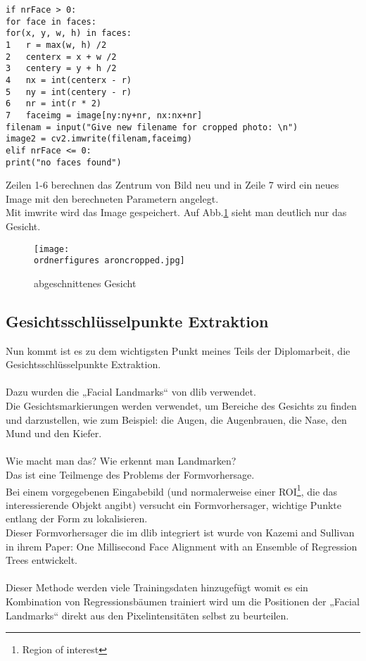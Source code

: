 \begin{lstlisting}
if nrFace > 0:
for face in faces:
for(x, y, w, h) in faces:
1	r = max(w, h) /2 
2	centerx = x + w /2 
3	centery = y + h /2
4	nx = int(centerx - r) 
5	ny = int(centery - r) 
6	nr = int(r * 2) 
7	faceimg = image[ny:ny+nr, nx:nx+nr] 
filenam = input("Give new filename for cropped photo: \n")
image2 = cv2.imwrite(filenam,faceimg)
elif nrFace <= 0:
print("no faces found")

\end{lstlisting}

Zeilen 1-6 berechnen das Zentrum von Bild neu und in Zeile 7 wird ein neues Image mit den berechneten Parametern angelegt.\\
Mit imwrite wird das Image gespeichert. Auf Abb.\ref{fig:aroncropped} sieht man deutlich nur das Gesicht. \\

\begin{figure}[H]
\texttt{[image: \\ordnerfigures aroncropped.jpg]}
\caption{abgeschnittenes Gesicht}
\label{fig:aroncropped}
\end{figure}

\subsection{Gesichtsschlüsselpunkte Extraktion}


Nun kommt ist es zu dem wichtigsten Punkt meines Teils der Diplomarbeit, die Gesichtsschlüsselpunkte Extraktion. \\\\
Dazu wurden die „Facial Landmarks“ von dlib verwendet. \\
Die Gesichtsmarkierungen werden verwendet, um Bereiche des Gesichts zu finden und darzustellen, wie zum Beispiel: die Augen, die Augenbrauen, die Nase, den Mund und den Kiefer. \\\\
Wie macht man das? Wie erkennt man Landmarken? \\Das ist eine Teilmenge des Problems der Formvorhersage.\\ Bei einem vorgegebenen Eingabebild (und normalerweise einer ROI\footnote{Region of interest}, die das interessierende Objekt angibt) versucht ein Formvorhersager, wichtige Punkte entlang der Form zu lokalisieren. \\
Dieser Formvorhersager die im dlib integriert ist wurde von Kazemi and Sullivan in ihrem Paper: One Millisecond Face Alignment with an Ensemble of Regression Trees entwickelt.\cite{Kazemi2014OneMF} \\\\
Dieser Methode werden viele Trainingsdaten hinzugefügt womit es ein Kombination von Regressionsbäumen trainiert wird um die Positionen der „Facial Landmarks“ direkt aus den Pixelintensitäten selbst zu beurteilen.\cite{Kazemi2014OneMF} \\


